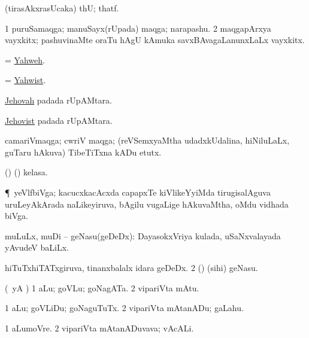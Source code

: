 \bentry
{} 
\gl{\BAavayx} 
\bmng
(tirasAkxrasUcaka) thU; thatf.
\emng
\eentry

\bentry
{} 
\gl{\nA} 
\bmng
\bnum
\num{1} puruSamaqga; manuSayx(rUpada) maqga; narapashu. 
\num{2} maqgapArxya vayxkitx; pashuvinaMte oraTu hAgU kAmuka savxBAvagaLanunxLaLx vayxkitx.
\enum
\emng   
\eentry

\bentry
{} 
\gl{\nA}
\bmng
= \hyperlink{Yahweh}{Yahweh}.
\emng
\eentry

\bentry
{} 
\gl{\nA}
\bmng
= \hyperlink{Yahwist}{Yahwist}.
\emng
\eentry

\bentry
{} 
\gl{\nA} 
\bmng
\hyperref{kandict_j.pdf}{J}{Jehovah}{Jehovah} padada rUpAMtara.
\emng 
\eentry

\bentry
{} 
\gl{\nA}
\bmng
\hyperref{kandict_j.pdf}{J}{Jehovist}{Jehovist} padada rUpAMtara.
\emng 
\eentry

\bentry
{} 
\gl{\nA}
\bmng
camariVmaqga; cwriV maqga; (reVSemxyaMtha udadxkUdalina, hiNiluLaLx, guTaru hAkuva) TibeTiTxna kADu etutx. 
\emng
\eentry

\bentry
{} 
\gl{\nA}
\bmng
(\AseTxrXV) (\ashi) kelasa.
\emng
\eentry

\bentry
{} 
\gl{\nA} 
\bmng
\P\ yeVlfbiVga; kacucxkacAcxda capapxTe kiVlikeYyiMda tirugisalAguva uruLeyAkArada naLikeyiruva, bAgilu \mo vugaLige hAkuvaMtha, oMdu vidhada biVga.  
\emng
\eentry

\bentry
{} 
\gl{\nA} 
\bmng
\bnum
{} muLuLx,  muDi -- geNasu(geDeDx): 
\banum
{} DayasokxVriya kulada, uSaNxvalayada yAvudeV baLiLx. 

 hiTuTxhiTATxgiruva, tinanxbalalx idara geDeDx. 
\eanum
\numie
\num{2} (\ame) (sihi) geNasu.
\enum
\emng
\eentry

\bentry
{} 
\gl{\nA}  
\bmng
(\AmA\ yA \pArxM) 
\bnum
\num{1} aLu; goVLu; goNagATa. 
\num{2} vipariVta mAtu.
\enum
\emng
\eentry

\bentry
{} 
\gl{\akirx} 
\bmng
\bnum
\num{1} aLu; goVLiDu; goNaguTuTx. 
\num{2} vipariVta mAtanADu; gaLahu.
\enum
\emng 
\eentry

\bentry
{} 
\gl{\nA} 
\bmng
\bnum
\num{1} aLumoVre. 
\num{2} vipariVta mAtanADuvava; vAcALi.
\enum
\emng
\eentry

